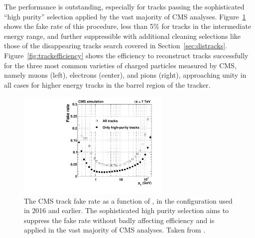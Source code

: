  The performance is outstanding, especially for tracks passing the sophisticated ``high purity'' selection applied by the vast majority of CMS analyses. 
  Figure~\ref{fig:trackfakerate} shows the fake rate of this procedure, less than 5\% for tracks in the intermediate energy range, and further suppressible with additional cleaning selections like those of the disappearing tracks search covered in Section~\ref{sec:distracks}.
  Figure~\ref{fig:trackefficiency} shows the efficiency to reconstruct tracks successfully for the three most common varieties of charged particles measured by CMS, namely muons (left), electrons (center), and pions (right), approaching unity in all cases for higher energy tracks in the barrel region of the tracker.

  \begin{figure}[h!]
    \centering
    \includegraphics[width=0.65\textwidth]{figures/fakerateVsPt.pdf}
    \caption[Track fake rate.]{
      The CMS track fake rate as a function of \pt, in the configuration used in 2016 and earlier. 
      The sophisticated high purity selection aims to suppress the fake rate without badly affecting efficiency and is applied in the vast majority of CMS analyses. 
      Taken from \cite{cmstracking}.}
    \label{fig:trackfakerate}
  \end{figure}  

